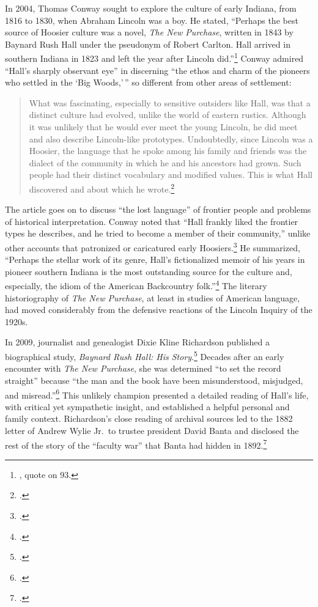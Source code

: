 \documentclass[
  american,
  letterpaper,
]{scrreprt}
\begin{document}
In 2004, Thomas Conway sought to explore the culture of early Indiana,
from 1816 to 1830, when Abraham Lincoln was a boy. He stated, ``Perhaps
the best source of Hoosier culture was a novel, \emph{The New Purchase},
written in 1843 by Baynard Rush Hall under the pseudonym of Robert
Carlton. Hall arrived in southern Indiana in 1823 and left the year
after Lincoln did.''\footnote{, quote on 93.}
Conway admired ``Hall's sharply observant eye'' in discerning ``the
ethos and charm of the pioneers who settled in the `Big Woods,'\,'' so
different from other areas of settlement:

\begin{quote}
What was fascinating, especially to sensitive outsiders like Hall, was
that a distinct culture had evolved, unlike the world of eastern
rustics. Although it was unlikely that he would ever meet the young
Lincoln, he did meet and also describe Lincoln-like prototypes.
Undoubtedly, since Lincoln was a Hoosier, the language that he spoke
among his family and friends was the dialect of the community in which
he and his ancestors had grown. Such people had their distinct
vocabulary and modified values. This is what Hall discovered and about
which he wrote.\footnote{.}
\end{quote}

The article goes on to discuss ``the lost language'' of frontier people
and problems of historical interpretation. Conway noted that ``Hall
frankly liked the frontier types he describes, and he tried to become a
member of their community,'' unlike other accounts that patronized or
caricatured early Hoosiers.\footnote{.} He summarized, ``Perhaps the stellar work of its genre, Hall's
fictionalized memoir of his years in pioneer southern Indiana is the
most outstanding source for the culture and, especially, the idiom of
the American Backcountry folk.''\footnote{.} The literary historiography of \emph{The New Purchase}, at least
in studies of American language, had moved considerably from the
defensive reactions of the Lincoln Inquiry of the 1920s.

In 2009, journalist and genealogist Dixie Kline Richardson published a
biographical study, \emph{Baynard Rush Hall: His Story}.\footnote{.} Decades after an early encounter with
\emph{The New Purchase}, she was determined ``to set the record
straight'' because ``the man and the book have been misunderstood,
misjudged, and misread.''\footnote{.} This unlikely champion presented a detailed reading of Hall's
life, with critical yet sympathetic insight, and established a helpful
personal and family context. Richardson's close reading of archival
sources led to the 1882 letter of Andrew Wylie Jr.~to trustee president
David Banta and disclosed the rest of the story of the ``faculty war''
that Banta had hidden in 1892.\footnote{.}
\end{document}
